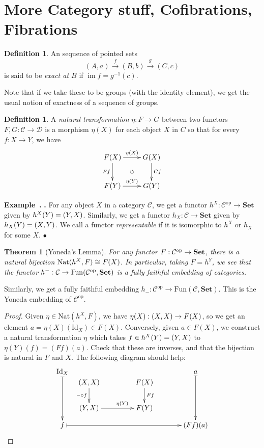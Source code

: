 \documentclass[12pt]{article}
\makeatletter
\theoremstyle{plain}
\newtheorem{theorem}[equation]{Theorem}
\theoremstyle{definition}
\newtheorem{definition}[equation]{Definition}
\newenvironment{example}[1][]{%
    \begin{trivlist} \item[]%
    \refstepcounter{equation}\textbf{Example~\theequation}%
    \@ifnotempty{#1}{\the\thm@notefont \ (#1)}\textbf{.} }%
    {\hspace*{\fill}$\bullet$ \end{trivlist}}
\theoremstyle{remark}
\renewcommand{\theequation}{\thesection.\arabic{equation}}
\newcommand\C{\mathcal{C}}
\let\hom\relax %
\DeclareMathOperator{\hom}{Hom}
\newcommand{\id}{\mathrm{Id}}
\DeclareMathOperator{\im}{im}
\makeatother
\begin{document}
 \section{More Category stuff, Cofibrations, Fibrations}
 \begin{definition}
   An sequence of pointed sets
   \[
    (A,a)\xrightarrow{f} (B,b)\xrightarrow{g} (C,c)
   \]
   is said to be \emph{exact at $B$} if $\im f = g^{-1}(c)$.
 \end{definition}
 Note that if we take these to be groups (with the identity element), we get the usual
 notion of exactness of a sequence of groups.
 \begin{definition}
   A \emph{natural transformation} $\eta:F\to G$ between two functors $F,G:\mathcal{C}\to
   \mathcal{D}$ is a morphism $\eta(X)$ for each object $X$ in $C$ so that for every
   $f:X\to Y$, we have
   \[\xymatrix{
    F(X) \ar[r]^{\eta(X)} \ar[d]_{Ff} \ar@{}[dr]|{\circlearrowleft} & G(X)\ar[d]^{Gf}\\
    F(Y) \ar[r]^{\eta(Y)} & G(Y)
   }\]
 \end{definition}
 \begin{example}
   For any object $X$ in a category $\C$, we get a functor $h^X:\C^\text{op}\to
   \textbf{Set}$ given by $h^X(Y)=\hom(Y,X)$. Similarly, we get a functor $h_X:\C \to
   \textbf{Set}$ given by $h_X(Y)=\hom(X,Y)$. We call a functor \emph{representable} if
   it is isomorphic to $h^X$ or $h_X$ for some $X$.
 \end{example}
 \begin{theorem}[Yoneda's Lemma]
   For any functor $F:\C^\text{op}\to \textrm{\bf Set}$, there is a natural
   bijection ${\rm Nat}(h^X,F)\cong F(X)$. In particular, taking $F=h^Y$, we see that
   the functor $h^{-}:\C\to {\rm Fun}(\C^\text{op},\textrm{\bf Set})$ is a fully
   faithful embedding of categories.
 \end{theorem}
 Similarly, we get a fully faithful embedding $h_{-}:\C^\text{op}\to
 \textrm{Fun}(\C,\textbf{Set})$. This is the Yoneda embedding of $\C^\text{op}$.
 \begin{proof}
   Given $\eta\in \textrm{Nat}(h^X,F)$, we have $\eta(X):\hom(X,X)\to F(X)$, so we get an
   element $a=\eta(X)(\id_X)\in F(X)$. Conversely, given $a\in F(X)$, we construct a
   natural transformation $\eta$ which takes $f\in h^X(Y)=\hom(Y,X)$ to
   $\eta(Y)(f)=(Ff)(a)$. Check that these are inverses, and that the bijection is natural
   in $F$ and $X$. The following diagram should help:
   \[\raisebox{6.5pc}{$\xymatrix @C=13pc @R=5pc{
   \id_X \ar@{|->}[d] \ar@{}[dr]|(.1){
      \xymatrix @!0 @R=3pc @C=6.5pc{
      \hom(X,X)\ar[d]_{- \circ f} & F(X) \ar[d]^{Ff}\\
      \hom(Y,X) \ar[r]^(.6){\eta(Y)} & F(Y)}
   } & a\ar@{|->}[d]\\
   f \ar@{|->}[r] & (Ff)(a)
   }$}\qedhere\]
 \end{proof}
\end{document}
